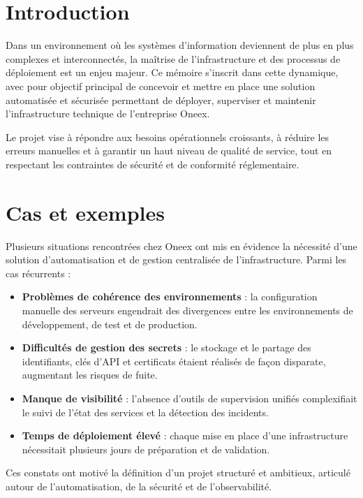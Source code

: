 \section{Introduction}

Dans un environnement où les systèmes d'information deviennent de plus en plus complexes et interconnectés, la maîtrise de l'infrastructure et des processus de déploiement est un enjeu majeur. Ce mémoire s'inscrit dans cette dynamique, avec pour objectif principal de concevoir et mettre en place une solution automatisée et sécurisée permettant de déployer, superviser et maintenir l'infrastructure technique de l'entreprise Oneex. 

Le projet vise à répondre aux besoins opérationnels croissants, à réduire les erreurs manuelles et à garantir un haut niveau de qualité de service, tout en respectant les contraintes de sécurité et de conformité réglementaire.

\section{Cas et exemples}

Plusieurs situations rencontrées chez Oneex ont mis en évidence la nécessité d'une solution d'automatisation et de gestion centralisée de l'infrastructure. Parmi les cas récurrents :

\begin{itemize}
    \item \textbf{Problèmes de cohérence des environnements} : la configuration manuelle des serveurs engendrait des divergences entre les environnements de développement, de test et de production.
    \item \textbf{Difficultés de gestion des secrets} : le stockage et le partage des identifiants, clés d'API et certificats étaient réalisés de façon disparate, augmentant les risques de fuite.
    \item \textbf{Manque de visibilité} : l'absence d'outils de supervision unifiés complexifiait le suivi de l'état des services et la détection des incidents.
    \item \textbf{Temps de déploiement élevé} : chaque mise en place d'une infrastructure nécessitait plusieurs jours de préparation et de validation.
\end{itemize}

Ces constats ont motivé la définition d'un projet structuré et ambitieux, articulé autour de l'automatisation, de la sécurité et de l'observabilité.

